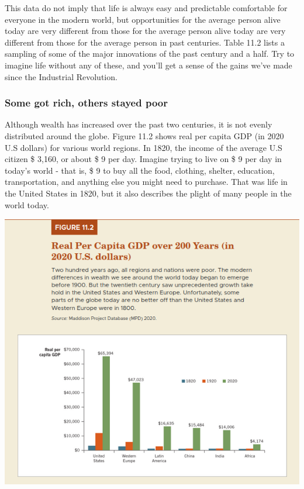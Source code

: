 \documentclass[11pt]{article} %
\theoremstyle{plain}
\theoremstyle{definition}
\begin{document}
This data do not imply that life is always easy and predictable comfortable for everyone in the modern world, but opportunities for the average person alive today are very different from those for the average person alive today are very different from those for the average person in past centuries. Table 11.2 lists a sampling of some of the major innovations of the past century and a half. Try to imagine life without any of these, and you'll get a sense of the gains we've made since the Industrial Revolution.

\subsubsection*{Some got rich, others stayed poor}

Although wealth has increased over the past two centuries, it is not evenly distributed around the globe. Figure 11.2 shows real per capita GDP (in 2020 U.S dollars) for various world regions. In 1820, the income of the average U.S citizen \$ 3,160, or about \$ 9 per day. Imagine trying to live  on \$ 9 per day in today's world - that is, \$ 9 to buy all the food, clothing, shelter, education, transportation, and anything else you might need to purchase. That was life in the United States in 1820, but it also describes the plight of many people in the world today.

\begin{center}
\includegraphics[scale=0.5]{../../images/Chapter 11/Figure 11.2.png}
\end{center}
\end{document}
